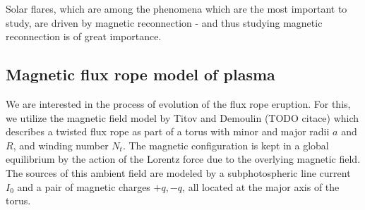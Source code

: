 Solar flares, which are among the phenomena which are the most important to study, are driven by magnetic reconnection - and thus studying magnetic reconnection is of great importance.

\subsection{Magnetic flux rope model of plasma}
We are interested in the process of evolution of the flux rope eruption. For this, we utilize the magnetic field model by Titov and Demoulin (TODO citace) which describes a twisted flux rope as part of a torus with minor and major radii $a$ and $R$, and winding number $N_t$. The magnetic configuration is kept in a global equilibrium by the action of the Lorentz force due to the overlying magnetic field. The sources of this ambient field are modeled by a subphotospheric line current $I_0$ and a pair of magnetic charges $+q,-q$, all located at the major axis of the torus.